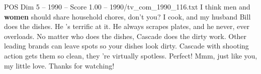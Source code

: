 \begin{textsample}{POS Dim 5 – 1990 – Score 1.00 – 1990/tv\_com\_1990\_116.txt}  \label{ex:f5_pos_029}
I think men and \textbf{women} should share household chores, don't you?
I cook, and my husband Bill does the dishes.
He 's terrific at it.
He always scrapes plates, and he never, ever overloads.
No matter who does the dishes, Cascade does the dirty work.
Other leading brands can leave spots so your dishes look dirty.
Cascade with shooting action gets them so clean, they 're virtually spotless.
Perfect!
Mmm, just like you, my little love.
Thanks for watching!

\end{textsample}
